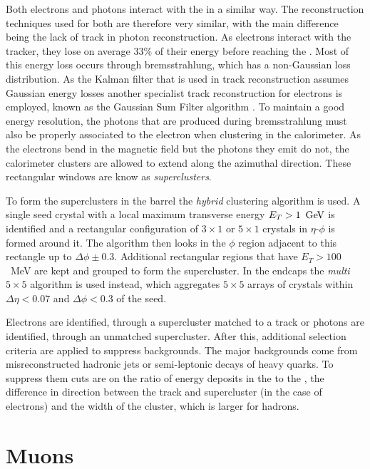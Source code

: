 Both electrons and photons interact with the \ECAL in a similar way.
The reconstruction techniques used for both are therefore very similar, with
the main difference being the lack of track in photon reconstruction.
As electrons interact with the tracker, they lose on average $33\%$ of
their energy before reaching the \ECAL \cite{1748-0221-10-06-P06005}.
Most of this energy loss occurs through bremsstrahlung, which has a
non-Gaussian loss distribution. As the Kalman filter that is used in
track reconstruction assumes Gaussian energy losses another specialist
track reconstruction for electrons is employed, known as the Gaussian
Sum Filter algorithm \cite{Adam:815410}. To maintain a good energy
resolution, the photons that are produced during bremsstrahlung must
also be properly associated to the electron when clustering in the
calorimeter. As the electrons bend in the magnetic field but the
photons they emit do not, the calorimeter clusters are allowed to
extend along the azimuthal direction. These rectangular \ECAL windows
are know as \emph{superclusters}.

To form the superclusters in the barrel the \emph{hybrid} clustering
algorithm is used. A single seed crystal with a local maximum
transverse energy $E_T>1~\mathrm{\,Ge\kern -0.1em V}$ is identified and a rectangular
configuration of $3\times 1$ or $5\times 1$ crystals in $\eta$-$\phi$
is formed around it. The algorithm then looks in the $\phi$ region
adjacent to this rectangle up to $\Delta\phi\pm 0.3$.
Additional rectangular regions that have $E_T>100$~MeV are kept and
grouped to form the supercluster. In the endcaps the \emph{multi $5\times
5$} algorithm is used instead, which aggregates $5\times 5$ arrays of
crystals within $\Delta\eta<0.07$ and $\Delta\phi<0.3$ of the seed.

Electrons are identified, through a supercluster matched to a track or
photons are identified, through an unmatched supercluster.  After
this, additional selection criteria are applied to suppress
backgrounds. The major backgrounds come from misreconstructed hadronic
jets or semi-leptonic decays of heavy quarks. To suppress them cuts
are on the ratio of energy deposits in the \HCAL to the \ECAL, the
difference in direction between the track and supercluster (in the
case of electrons) and the width of the cluster, which is larger for
hadrons.

\section{Muons}
\label{sec:muons_reco}


